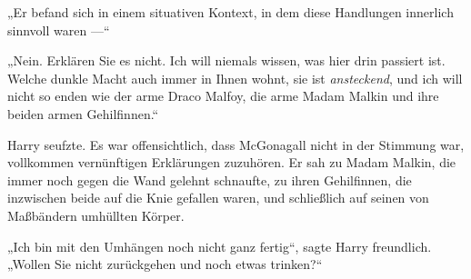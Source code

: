 „Er befand sich in einem situativen Kontext, in dem diese Handlungen innerlich sinnvoll waren —“

„Nein. Erklären Sie es nicht. Ich will niemals wissen, was hier drin passiert ist. Welche dunkle Macht auch immer in Ihnen wohnt, sie ist \emph{ansteckend}, und ich will nicht so enden wie der arme Draco Malfoy, die arme Madam Malkin und ihre beiden armen Gehilfinnen.“

Harry seufzte. Es war offensichtlich, dass McGonagall nicht in der Stimmung war, vollkommen vernünftigen Erklärungen zuzuhören. Er sah zu Madam Malkin, die immer noch gegen die Wand gelehnt schnaufte, zu ihren Gehilfinnen, die inzwischen beide auf die Knie gefallen waren, und schließlich auf seinen von Maßbändern umhüllten Körper.

„Ich bin mit den Umhängen noch nicht ganz fertig“, sagte Harry freundlich.
„Wollen Sie nicht zurückgehen und noch etwas trinken?“

